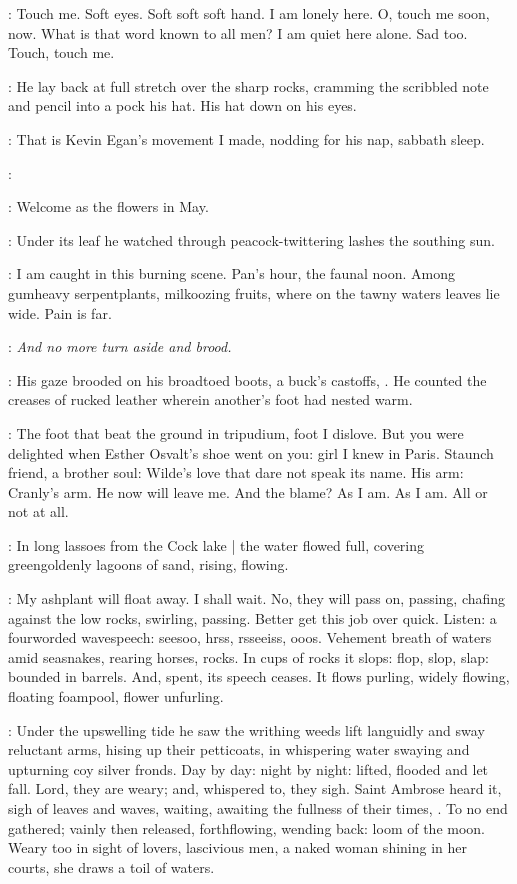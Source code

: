 \StephenInt:
Touch me.
Soft eyes.
Soft soft soft hand.
I am lonely here.
O, touch me soon, now.
What is that word known to all men?
I am quiet here alone.
Sad too.
Touch, touch me.

:
He lay back at full stretch over the sharp rocks,
cramming the scribbled note and pencil into a pock his hat.
His hat down on his eyes.

\StephenInt:
That is Kevin Egan's movement I made,
nodding for his nap, sabbath sleep.

\kevin:

\StephenInt:
Welcome as the flowers in May.

:
Under its leaf he watched through peacock-twittering lashes
the southing sun.

\StephenInt:
I am caught in this burning scene.
Pan's hour, the faunal noon.
Among gumheavy serpentplants, milkoozing fruits,
where on the tawny waters leaves lie wide.
Pain is far.

\StephenInt:
\emph{And no more turn aside and brood.}

:
His gaze brooded on his broadtoed boots, a buck's castoffs, .
He counted the creases of rucked leather wherein another's foot had nested warm.

\StephenInt:
The foot that beat the ground in tripudium,
foot I dislove.
But you were delighted when Esther Osvalt's shoe went on you:
girl I knew in Paris.
Staunch friend, a brother soul:
Wilde's love that dare not speak its name.
His arm:
Cranly's arm.
He now will leave me.
And the blame?
As I am.
As I am.
All or not at all.

:
In long lassoes from the Cock lake |
the water flowed full,
covering greengoldenly lagoons of sand,
rising, flowing.

\StephenInt:
My ashplant will float away.
I shall wait.
No, they will pass on, passing,
chafing against the low rocks, swirling, passing.
Better get this job over quick.
Listen:
a fourworded wavespeech:
seesoo, hrss, rsseeiss, ooos.
Vehement breath of waters
amid seasnakes, rearing horses, rocks.
In cups of rocks it slops:
flop, slop, slap:
bounded in barrels.
And, spent, its speech ceases.
It flows purling,
widely flowing,
floating foampool,
flower unfurling.

:
Under the upswelling tide
he saw the writhing weeds lift languidly
and sway reluctant arms,
hising up their petticoats,
in whispering water swaying and upturning coy silver fronds.
Day by day:
night by night:
lifted, flooded and let fall.
Lord, they are weary;
and, whispered to, they sigh.
Saint Ambrose heard it,
sigh of leaves and waves,
waiting, awaiting the fullness of their times,
.
To no end gathered;
vainly then released, forthflowing,
wending back:
loom of the moon.
Weary too in sight of lovers,
lascivious men,
a naked woman shining in her courts,
she draws a toil of waters.

